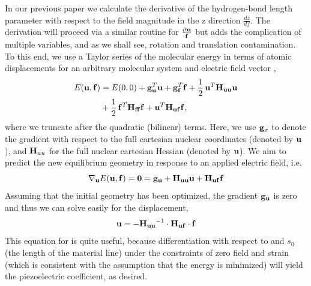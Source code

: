 In our previous paper we calculate the derivative of the hydrogen-bond length parameter with respect to the field magnitude in the z direction
$\frac{dz}{df}$.
The derivation will proceed via a similar routine for $\frac{\partial {\mathbf u}}{{\mathbf f}}$ but adds the complication of 
multiple variables, and as we shall see, rotation and translation contamination.  
To this end, we use a Taylor series of the molecular energy in terms of atomic displacements \uu{} for an arbitrary molecular system 
and electric field vector \ff{},
\begin{equation}
\begin{aligned}
E({\bf{u}},{\bf{f}}) 
  &= E(0,0) + {\mathbf g}_{{\bf{u}}}^{T} {\bf{u}} + {\mathbf g}_{{\bf{f}}}^{T} {\bf{f}} + \frac{1}{2} \, {\bf{u}}^T {\mathbf H}_{{\bf{u}}{\bf{u}}} {\bf{u}} \\
  &+ \frac{1}{2} \, {\bf{f}}^T {\mathbf H}_{{\bf{f}}{\bf{f}}} {\bf{f}} + {\bf{u}}^T {\mathbf H}_{{\bf{u}}{\bf{f}}} {\bf{f}},
\end{aligned}
\end{equation}
where we truncate after the quadratic (bilinear) terms. Here, we use ${\mathbf g}_{x}$ to denote the gradient with respect
to the full cartesian nuclear coordinates (denoted by ${\bf{u}}$), and ${\mathbf H}_{uu}$ for the full nuclear cartesian Hessian (denoted by ${\bf{u}}$). 
We aim to predict the new equilibrium geometry in response to an applied electric field, i.e.
\begin{equation}
\nabla_{{\bf{u}}}E({\bf{u}},{\bf{f}}) = {\mathbf 0} = {\mathbf g}_{{\bf{u}}} + {\mathbf H}_{{\bf{u}}{\bf{u}}} {\bf{u}} + {\mathbf H}_{{\bf{u}}{\bf{f}}} {\bf{f}}
\end{equation}
Assuming that the initial geometry has been optimized, the gradient ${\mathbf g}_{{\bf{u}}}$ is zero and thus we can solve easily
for the displacement, 
\begin{equation}
\label{eq:xvec}
{\ensuremath{\bf{u}}} = -{\bf{H_{{\ensuremath{\bf{u}}}{\ensuremath{\bf{u}}}}}}^{-1} \cdot \bf{H_{{\ensuremath{\bf{u}}}{\ensuremath{\bf{f}}}}}\cdot {\ensuremath{\bf{f}}}
\end{equation}
This equation for \uu{} is quite useful, because differentiation with respect to \ff{} and $s_0$ (the length of the material
line) under the constraints of zero field and strain (which is consistent with the assumption that the energy is minimized) 
will yield the piezoelectric coefficient, as desired.  

